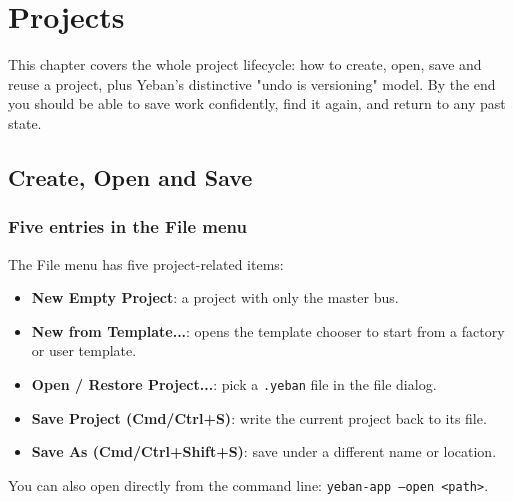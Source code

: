 
\chapter{Projects}
\label{ch:projects}






This chapter covers the whole project lifecycle: how to create, open, save and reuse
a project, plus Yeban's distinctive "undo is versioning" model. By the end you should
be able to save work confidently, find it again, and return to any past state.

\section{Create, Open and Save}

\subsection{Five entries in the File menu}

The File menu has five project-related items:

\begin{itemize}
  \item \textbf{New Empty Project}: a project with only the master bus.
  \item \textbf{New from Template...}: opens the template chooser to start from a factory or user template.
  \item \textbf{Open / Restore Project...}: pick a \texttt{.yeban} file in the file dialog.
  \item \textbf{Save Project (Cmd/Ctrl+S)}: write the current project back to its file.
  \item \textbf{Save As (Cmd/Ctrl+Shift+S)}: save under a different name or location.
\end{itemize}

You can also open directly from the command line: \texttt{yeban-app --open <path>}.

